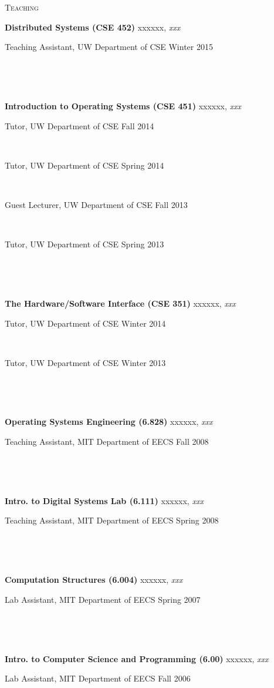 \documentclass[10pt,times]{report}
\newlength{\sectiongap}
\newlength{\entrygap}
\newlength{\sectioncolwidth}
\newlength{\colgap}
\newlength{\stuffwidth}
\def\ifEqString#1#2{\def\testa{#1}\def\testb{#2}%
  \ifx\testa\testb}
\newenvironment{rtable}{
  \begin{minipage}{\textwidth}
  }{
  \end{minipage}
}
\newenvironment{rentry}[3][xxx]{
  \begin{minipage}[t]{\hsize}
    \textbf{#2}\ifEqString{#1}{xxx}\relax\else, \textit{#1}\fi
    \hspace{\stretch{1}} #3 \\
  }{
    \removelastskip
  \end{minipage}
  \\[\entrygap]  %
}
\newcommand{\rline}[2]{
  \begin{minipage}[t]{\hsize}
    #1 \hspace{\stretch{1}} #2
  \end{minipage} \\
}
\newenvironment{rsection}[1]{
  \begin{minipage}[t]{\sectioncolwidth}
    \textsc{#1}
  \end{minipage}
  \hspace{\colgap}
  \begin{minipage}[t]{\stuffwidth}
  }{
    \removelastskip
  \end{minipage}
  \\[\sectiongap]
}
\begin{document}
\begin{rtable}
  \begin{rsection}{Teaching}
    \begin{rentry}{Distributed Systems (CSE 452)}{}
      \rline{Teaching Assistant, UW Department of CSE}{Winter
        2015}   
      \vspace{-0.5em}   
    \end{rentry}
    \begin{rentry}{Introduction to Operating Systems (CSE 451)}{}
      \rline{Tutor, UW Department of CSE}{Fall 2014}
      \rline{Tutor, UW Department of CSE}{Spring 2014}
      \rline{Guest Lecturer, UW Department of CSE}{Fall 2013}
      \rline{Tutor, UW Department of CSE}{Spring 2013}
      \vspace{-0.5em}
    \end{rentry}
    \begin{rentry}{The Hardware/Software Interface (CSE 351)}{}
      \rline{Tutor, UW Department of CSE}{Winter 2014}
      \rline{Tutor, UW Department of CSE}{Winter 2013}
      \vspace{-0.5em}
    \end{rentry}
    \begin{rentry}{Operating Systems Engineering (6.828)}{}
      \rline{Teaching Assistant, MIT Department of EECS}{Fall
        2008} 
      \vspace{-0.5em}
    \end{rentry}
    \begin{rentry}{Intro. to Digital Systems Lab (6.111)}{}
      \rline{Teaching Assistant, MIT Department of EECS}{Spring
        2008} 
      \vspace{-0.5em}
    \end{rentry}
    \begin{rentry}{Computation Structures (6.004)}{}
      \rline{Lab Assistant, MIT Department of EECS}{Spring 2007}
      \vspace{-0.5em}
    \end{rentry}
    \begin{rentry}{Intro. to Computer Science and
        Programming (6.00)}{}
      \rline{Lab Assistant, MIT Department of EECS}{Fall 2006}
      \vspace{-0.5em}
    \end{rentry}
  \end{rsection}
\end{rtable}
\end{document}
